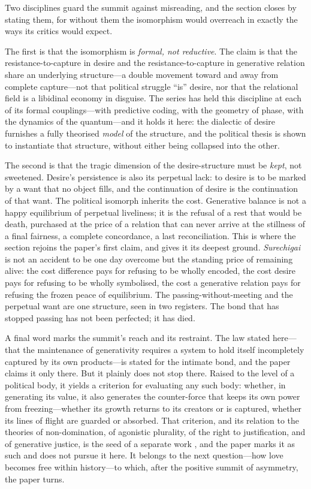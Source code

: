 Two disciplines guard the summit against misreading, and the section closes by stating them, for without them the isomorphism would overreach in exactly the ways its critics would expect.

The first is that the isomorphism is \emph{formal, not reductive}. The claim is that the resistance-to-capture in desire and the resistance-to-capture in generative relation share an underlying structure---a double movement toward and away from complete capture---not that political struggle ``is'' desire, nor that the relational field is a libidinal economy in disguise. The series has held this discipline at each of its formal couplings---with predictive coding, with the geometry of phase, with the dynamics of the quantum---and it holds it here: the dialectic of desire furnishes a fully theorised \emph{model} of the structure, and the political thesis is shown to instantiate that structure, without either being collapsed into the other.

The second is that the tragic dimension of the desire-structure must be \emph{kept}, not sweetened. Desire's persistence is also its perpetual lack: to desire is to be marked by a want that no object fills, and the continuation of desire is the continuation of that want. The political isomorph inherits the cost. Generative balance is not a happy equilibrium of perpetual liveliness; it is the refusal of a rest that would be death, purchased at the price of a relation that can never arrive at the stillness of a final fairness, a complete concordance, a last reconciliation. This is where the section rejoins the paper's first claim, and gives it its deepest ground. \emph{Surechigai} is not an accident to be one day overcome but the standing price of remaining alive: the cost difference pays for refusing to be wholly encoded, the cost desire pays for refusing to be wholly symbolised, the cost a generative relation pays for refusing the frozen peace of equilibrium. The passing-without-meeting and the perpetual want are one structure, seen in two registers. The bond that has stopped passing has not been perfected; it has died.

\medskip
\noindent
A final word marks the summit's reach and its restraint. The law stated here---that the maintenance of generativity requires a system to hold itself incompletely captured by its own products---is stated for the intimate bond, and the paper claims it only there. But it plainly does not stop there. Raised to the level of a political body, it yields a criterion for evaluating any such body: whether, in generating its value, it also generates the counter-force that keeps its own power from freezing---whether its growth returns to its creators or is captured, whether its lines of flight are guarded or absorbed. That criterion, and its relation to the theories of non-domination, of agonistic plurality, of the right to justification, and of generative justice, is the seed of a separate work \parencite{eglash2016}, and the paper marks it as such and does not pursue it here. It belongs to the next question---how love becomes free within history---to which, after the positive summit of asymmetry, the paper turns.

